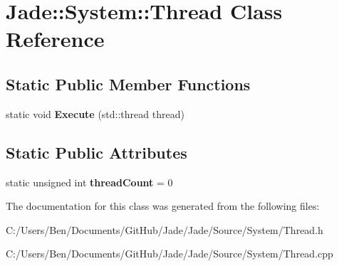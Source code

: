 \hypertarget{class_jade_1_1_system_1_1_thread}{}\section{Jade\+:\+:System\+:\+:Thread Class Reference}
\label{class_jade_1_1_system_1_1_thread}
\subsection*{Static Public Member Functions}
\begin{DoxyCompactItemize}
\item 
\hypertarget{class_jade_1_1_system_1_1_thread_a192fdadcd198c2d6110906fbdd56f92a}{}static void {\bfseries Execute} (std\+::thread thread)\label{class_jade_1_1_system_1_1_thread_a192fdadcd198c2d6110906fbdd56f92a}

\end{DoxyCompactItemize}
\subsection*{Static Public Attributes}
\begin{DoxyCompactItemize}
\item 
\hypertarget{class_jade_1_1_system_1_1_thread_a1b91615979b11fa41376d4718a6eec8f}{}static unsigned int {\bfseries thread\+Count} = 0\label{class_jade_1_1_system_1_1_thread_a1b91615979b11fa41376d4718a6eec8f}

\end{DoxyCompactItemize}


The documentation for this class was generated from the following files\+:\begin{DoxyCompactItemize}
\item 
C\+:/\+Users/\+Ben/\+Documents/\+Git\+Hub/\+Jade/\+Jade/\+Source/\+System/Thread.\+h\item 
C\+:/\+Users/\+Ben/\+Documents/\+Git\+Hub/\+Jade/\+Jade/\+Source/\+System/Thread.\+cpp\end{DoxyCompactItemize}
